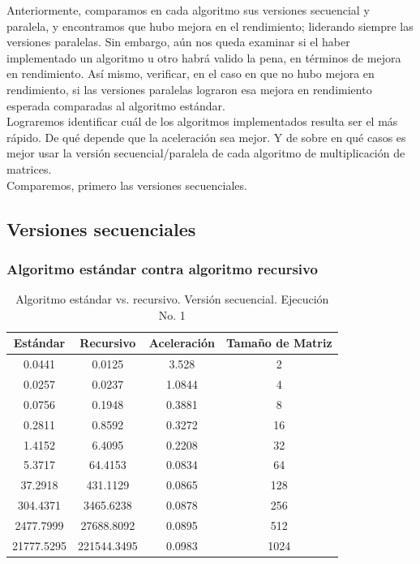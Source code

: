 \documentclass{article}
\begin{document}
Anteriormente, comparamos en cada algoritmo sus versiones secuencial y paralela, y encontramos que hubo mejora en el rendimiento; liderando siempre las versiones paralelas. Sin embargo, aún nos queda examinar si el haber implementado un algoritmo u otro habrá valido la pena, en términos de mejora en rendimiento. Así mismo, verificar, en el caso en que no hubo mejora en rendimiento, si las versiones paralelas lograron esa mejora en rendimiento esperada comparadas al algoritmo estándar.\\

Lograremos identificar cuál de los algoritmos implementados resulta ser el más rápido. De qué depende que la aceleración sea mejor. Y de sobre en qué casos es mejor usar la versión secuencial/paralela de cada algoritmo de multiplicación de matrices.\\

Comparemos, primero las versiones secuenciales.

\subsection{Versiones secuenciales}

\subsubsection{Algoritmo estándar contra algoritmo recursivo}

\begin{table}[ht]
\centering
\begin{tabular}{|c|c|c|c|}
\hline
\textbf{Estándar} & \textbf{Recursivo} & \textbf{Aceleración} & \textbf{Tamaño de Matriz} \\
\hline
0.0441 & 0.0125 & 3.528 & 2 \\
0.0257 & 0.0237 & 1.0844 & 4 \\
0.0756 & 0.1948 & 0.3881 & 8 \\
0.2811 & 0.8592 & 0.3272 & 16 \\
1.4152 & 6.4095 & 0.2208 & 32 \\
5.3717 & 64.4153 & 0.0834 & 64 \\
37.2918 & 431.1129 & 0.0865 & 128 \\
304.4371 & 3465.6238 & 0.0878 & 256 \\
2477.7999 & 27688.8092 & 0.0895 & 512 \\
21777.5295 & 221544.3495 & 0.0983 & 1024 \\
\hline
\end{tabular}
\caption{Algoritmo estándar vs. recursivo. Versión secuencial. Ejecución No. 1}
\end{table}
\end{document}

